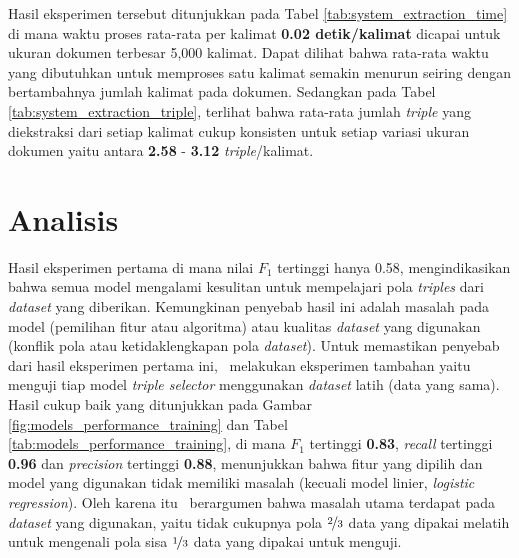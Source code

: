 Hasil eksperimen tersebut ditunjukkan pada Tabel \ref{tab:system_extraction_time} di mana waktu proses rata-rata per kalimat \textbf{0.02 detik/kalimat} dicapai untuk ukuran dokumen terbesar 5,000 kalimat. Dapat dilihat bahwa rata-rata waktu yang dibutuhkan untuk memproses satu kalimat semakin menurun seiring dengan bertambahnya jumlah kalimat pada dokumen. Sedangkan pada Tabel \ref{tab:system_extraction_triple}, terlihat bahwa rata-rata jumlah \textit{triple} yang diekstraksi dari setiap kalimat cukup konsisten untuk setiap variasi ukuran dokumen yaitu antara \textbf{2.58} - \textbf{3.12} \textit{triple}/kalimat. 


\section{Analisis}

Hasil eksperimen pertama di mana nilai $F_1$ tertinggi hanya 0.58, mengindikasikan bahwa semua model mengalami kesulitan untuk mempelajari pola \textit{triples} dari \textit{dataset} yang diberikan. Kemungkinan penyebab hasil ini adalah masalah pada model (pemilihan fitur atau algoritma) atau kualitas \textit{dataset} yang digunakan (konflik pola atau ketidaklengkapan pola \textit{dataset}). Untuk memastikan penyebab dari hasil eksperimen pertama ini, \saya~melakukan eksperimen tambahan yaitu menguji tiap model \textit{triple selector} menggunakan \textit{dataset} latih (data yang sama). Hasil cukup baik yang ditunjukkan pada Gambar \ref{fig:models_performance_training} dan Tabel \ref{tab:models_performance_training}, di mana $F_1$ tertinggi \textbf{0.83}, \textit{recall} tertinggi \textbf{0.96} dan \textit{precision} tertinggi \textbf{0.88}, menunjukkan bahwa fitur yang dipilih dan model yang digunakan tidak memiliki masalah (kecuali model linier, \textit{logistic regression}). Oleh karena itu \saya~berargumen bahwa masalah utama terdapat pada \textit{dataset} yang digunakan, yaitu tidak cukupnya pola $\nicefrac{2}{3}$ data yang dipakai melatih untuk mengenali pola sisa $\nicefrac{1}{3}$ data yang dipakai untuk menguji.

